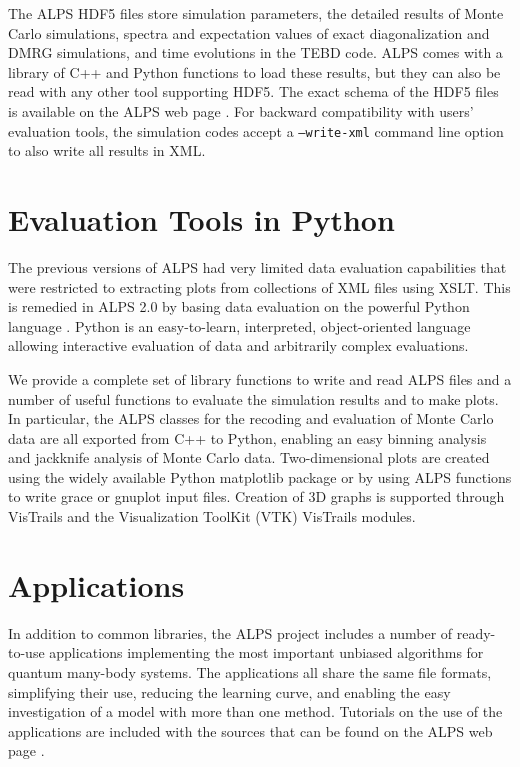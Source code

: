 \documentclass[12pt]{iopart}
\begin{document}
The ALPS HDF5 files store simulation parameters, the detailed results of Monte Carlo simulations, spectra and expectation values of exact diagonalization and DMRG simulations, and time evolutions in the TEBD code. ALPS comes with a library of C++ and Python functions to load these results, but they can also be read with any other tool supporting HDF5. The exact schema of the HDF5 files is available on the ALPS web page \cite{alps}. For backward compatibility with users' evaluation tools, the simulation codes accept a {\tt --write-xml} command line option to also write all results in XML. 

\section{Evaluation Tools in Python}

The previous versions of ALPS had very limited data evaluation capabilities that were restricted to extracting plots from collections of XML files using XSLT. This is remedied in ALPS 2.0 by basing data evaluation on the powerful Python language \cite{python}. Python is an easy-to-learn, interpreted, object-oriented language allowing interactive evaluation of data and arbitrarily complex evaluations. 

We provide a complete set of library functions to write and read ALPS files and a number of useful functions to evaluate the simulation results and to make plots. In particular, the ALPS classes for the recoding and evaluation of Monte Carlo data are all exported from C++ to Python, enabling an easy binning analysis \cite{Ambegaokar2010} and jackknife analysis of Monte Carlo data.
Two-dimensional plots are created using the widely available Python matplotlib package \cite{matplotlib} or by using ALPS functions to write grace \cite{grace} or gnuplot \cite{gnuplot} input files. Creation of 3D graphs is supported through VisTrails and the Visualization ToolKit (VTK) \cite{vtk} VisTrails modules.



\section{Applications}
\label{sec:applications}
In addition to common libraries, the ALPS project includes a number of ready-to-use applications implementing the most important unbiased
algorithms for quantum many-body systems. The applications all
share the same file formats, simplifying their use, reducing the
learning curve, and enabling the easy investigation of a model with
more than one method. Tutorials on the use of the applications are
included with the sources that can be found on the ALPS web
page \cite{alps}.
\end{document}
